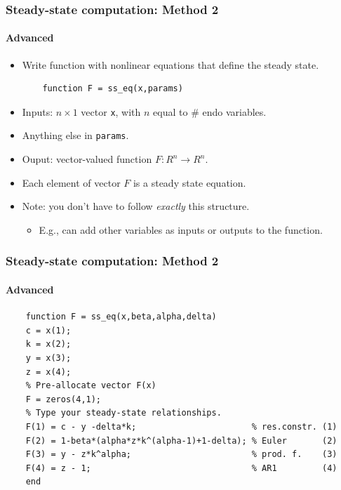 \documentclass{beamer}
\begin{document}
\begin{frame}[fragile]
\frametitle{Steady-state computation: Method 2}
\framesubtitle{Advanced}
\small 
\begin{itemize}
	\item Write function with nonlinear equations that define the steady state.
	\begin{verbatim}
	function F = ss_eq(x,params)
	\end{verbatim}
	\item Inputs: $ n \times 1 $ vector \texttt{x}, with $ n $ equal to \# endo variables.
	\item Anything else in \texttt{params}. 
	\item Ouput: vector-valued function $ F:R^{n}\rightarrow R^{n}$.
	\item Each element of vector $ F $ is a steady state equation.
	\item Note: you don't have to follow \textit{exactly} this structure.
	\begin{itemize}
		\item E.g., can add other variables as inputs or outputs to the function.
	\end{itemize}
\end{itemize}
\end{frame}

\begin{frame}[fragile]
\frametitle{Steady-state computation: Method 2}
\framesubtitle{Advanced}
\small 

	\begin{verbatim}
	function F = ss_eq(x,beta,alpha,delta)
	c = x(1);
	k = x(2);
	y = x(3);
	z = x(4);
	% Pre-allocate vector F(x)
	F = zeros(4,1);
	% Type your steady-state relationships.
	F(1) = c - y -delta*k;                       % res.constr. (1)
	F(2) = 1-beta*(alpha*z*k^(alpha-1)+1-delta); % Euler       (2)
	F(3) = y - z*k^alpha;                        % prod. f.    (3)
	F(4) = z - 1;                                % AR1         (4)
	end
	\end{verbatim}
\end{frame}
\end{document}
